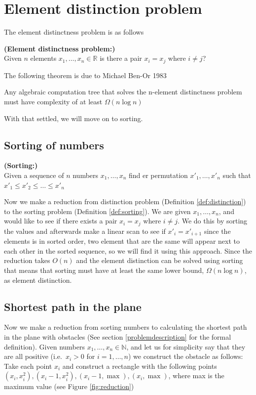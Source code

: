 \section{Element distinction problem}

The element distinctness problem is as follows
\begin{mydef} \textbf{(Element distinctness problem:)} \\
	\label{def:distinction}
	Given $n$ elements $x_1,\dots,x_n\in \mathbb{R}$ is there a pair $x_i=x_j$
	where $i\neq j$?
\end{mydef}

The following theorem is due to Michael Ben-Or 1983 \cite{DBLP:conf/stoc/Ben-Or83}

\begin{theorem}
	\label{thm:distinction_lower}
Any algebraic computation tree that solves the n-element distinctness problem
must have complexity of at least $\Omega{(n \log n)}$
\end{theorem}

With that settled, we will move on to sorting.

\subsection{Sorting of numbers}

\begin{mydef}\textbf{(Sorting:)} \label{def:sorting} \\
    Given a sequence of $n$ numbers $x_1,\dots,x_n$ find er permutation
	$x'_1,\dots,x'_n$ such that  $x'_1\leq x'_2 \leq\dots\leq x'_n$
\end{mydef}

Now we make a reduction from distinction problem (Definition \ref{def:distinction}) to
the sorting problem (Definition \ref{def:sorting}). We are given $x_1,\dots,
x_n$, and would like to
see if there exists a pair $x_i=x_j$ where $i\neq j$. We do this by sorting the
values and afterwards make a linear scan to see if $x'_i = x'_{i+1}$ since the 
elements is in sorted order, two element that are the same will appear next to
each other in the sorted sequence, so we will find it using this approach.
Since the reduction takes $O(n)$ and the element distinction can be solved
using sorting that means that sorting must have at least the same lower bound,
$\Omega(n\log n)$, as element distinction. 

\subsection{Shortest path in the plane}
Now we make a reduction from sorting numbers to calculating the shortest path
in the plane with obstacles (See section \ref{problemdescription} for the
formal definition).
Given numbers $x_1,\dots,x_n\in \mathbb{N}$, and let us for simplicity say that they
are all positive
(i.e.\ $x_i>0$ for $i=1,\dots,n$) we construct the obstacle as follows: Take each
point $x_i$ and construct a rectangle with the following points
$(x_i,x_i^2),(x_i-1,x_i^2),(x_i-1,\max), (x_i,\max)$, where max is the maximum
value (see Figure \ref{fig:reduction})

